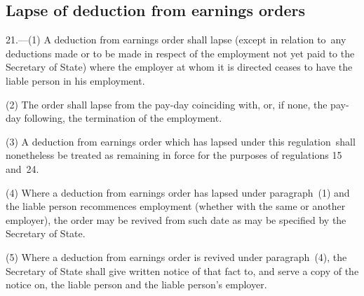 \documentclass[12pt,a4paper]{article}
\begin{document}

\subsection[21. Lapse of deduction from earnings orders]{Lapse of deduction from earnings orders}

21.—(1) A deduction from earnings order shall lapse (except in relation to~any deductions made or to be made in respect of the employment not yet paid to the Secretary of State) where the employer at whom it is directed ceases to have the liable person in his employment.

(2) The order shall lapse from the pay-day coinciding with, or, if none, the pay-day following, the termination of the employment.

(3) A deduction from earnings order which has lapsed under this regulation~shall nonetheless be treated as remaining in force for the purposes of regulations 15 and~24.

(4) Where a deduction from earnings order has lapsed under paragraph~(1) and the liable person recommences employment (whether with the same or another employer), the order may be revived from such date as may be specified by the Secretary of State.

(5) Where a deduction from earnings order is revived under paragraph~(4), the Secretary of State shall give written notice of that fact to, and serve a copy of the notice on, the liable person and the liable person’s employer.
\end{document}
